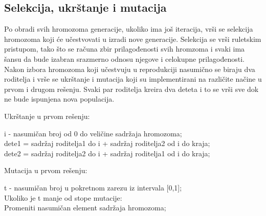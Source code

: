 \documentclass[a4paper]{article}
\begin{document}
\subsection{Selekcija, ukrštanje i mutacija}
\par Po obradi svih hromozoma generacije, ukoliko ima još iteracija, vrši se selekcija hromozoma koji će učestvovati u izradi nove generacije. Selekcija se vrši ruletskim pristupom, tako što se računa zbir prilagođenosti svih hromzoma i svaki ima šansu da bude izabran srazmerno odnosu njegove i celokupne prilagođenosti. Nakon izbora hromozoma koji učestvuju u reprodukciji nasumično se biraju dva roditelja i vrše se ukrštanje i mutacija koji su implementirani na različite načine u prvom i drugom rešenju. Svaki par roditelja kreira dva deteta i to se vrši sve dok ne bude ispunjena nova populacija. 
\begin{tcolorbox}
\begin{center}
Ukrštanje u prvom rešenju: \\
\end{center}
i - nasumičan broj od 0 do veličine sadržaja hromozoma;\\
dete1 = sadržaj roditelja1 do i + sadržaj roditelja2 od i do kraja; \\
dete2 = sadržaj roditelja2 do i + sadržaj roditelja1 od  i do kraja; \\
\begin{center}
Mutacija u prvom rešenju:  \\
\end{center}
t - nasumičan broj u pokretnom zarezu iz intervala [0,1];\\
Ukoliko je t manje od stope mutacije: \\
\hphantom{tcolorbox}Promeniti nasumičan element sadržaja hromozoma;
\end{tcolorbox}
\end{document}
